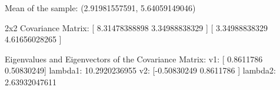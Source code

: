 \documentclass{article}
\begin{document}
Mean of the sample: (2.91981557591, 5.64059149046)

2x2 Covariance Matrix:
[ 8.31478388898  3.34988838329 ]
[ 3.34988838329  4.61656028265 ]

Eigenvalues and Eigenvectors of the Covariance Matrix:
v1: [ 0.8611786   0.50830249]  lambda1: 10.2920236955
v2: [-0.50830249  0.8611786 ]  lambda2: 2.63932047611
\end{document}
